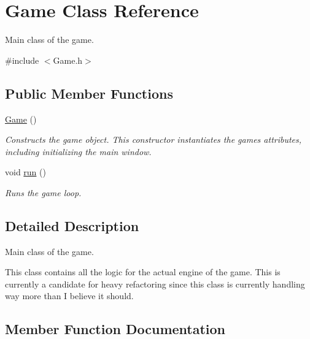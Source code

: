 \hypertarget{classGame}{}\section{Game Class Reference}
\label{classGame}


Main class of the game.  




{\ttfamily \#include $<$Game.\+h$>$}

\subsection*{Public Member Functions}
\begin{DoxyCompactItemize}
\item 
\mbox{\label{classGame_ad59df6562a58a614fda24622d3715b65}} 
\mbox{\hyperlink{classGame_ad59df6562a58a614fda24622d3715b65}{Game}} ()
\begin{DoxyCompactList}\small\item\em Constructs the game object. This constructor instantiates the game\textquotesingle{}s attributes, including initializing the main window. \end{DoxyCompactList}\item 
void \mbox{\hyperlink{classGame_a1ab78f5ed0d5ea879157357cf2fb2afa}{run}} ()
\begin{DoxyCompactList}\small\item\em Runs the game loop. \end{DoxyCompactList}\end{DoxyCompactItemize}


\subsection{Detailed Description}
Main class of the game. 

This class contains all the logic for the actual engine of the game. This is currently a candidate for heavy refactoring since this class is currently handling way more than I believe it should. 

\subsection{Member Function Documentation}
\mbox{\label{classGame_a1ab78f5ed0d5ea879157357cf2fb2afa}} 
